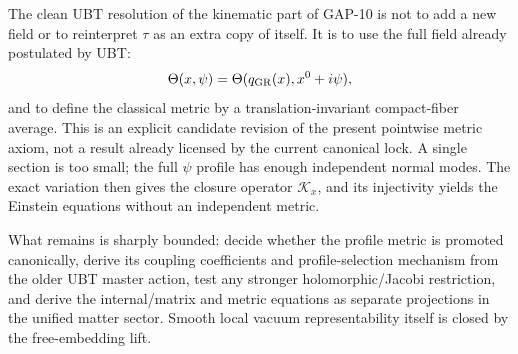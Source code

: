 \documentclass[11pt,a4paper]{article}
\theoremstyle{remark}
\begin{document}
The clean UBT resolution of the kinematic part of GAP-10 is not to add a new
field or to reinterpret $\tau$ as an extra copy of itself.  It is to use the
full field already postulated by UBT:
\begin{equation}
  \Theta(x,\psi)=\Theta(q_{\rm GR}(x),x^0+i\psi),
\end{equation}
and to define the classical metric by a translation-invariant compact-fiber
average.  This is an explicit candidate revision of the present pointwise
metric axiom, not a result already licensed by the current canonical lock.  A single section is too small; the full
$\psi$ profile has enough independent normal modes.  The exact variation then
gives the closure operator $\mathcal K_x$, and its injectivity yields the
Einstein equations without an independent metric.

What remains is sharply bounded: decide whether the profile metric is promoted
canonically, derive its coupling coefficients and profile-selection mechanism
from the older UBT master action, test any stronger holomorphic/Jacobi
restriction, and derive the internal/matrix and metric equations as separate
projections in the unified matter sector.  Smooth local vacuum
representability itself is closed by the free-embedding lift.
\end{document}
